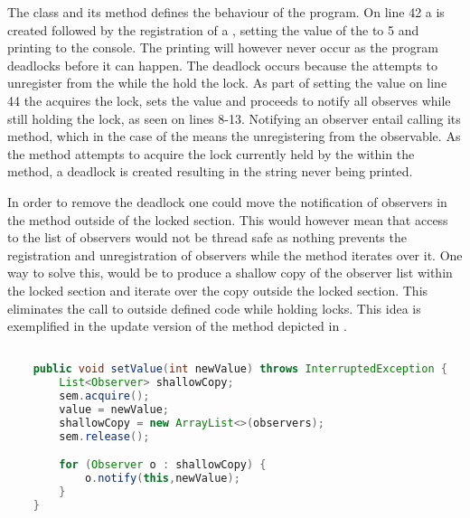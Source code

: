 The  class and its  method defines the behaviour of the program. On line 42 a  is created followed by the registration of a , setting the value of the  to 5 and printing  to the console. The printing will however never occur as the program deadlocks before it can happen. The deadlock occurs because the  attempts to unregister from the  while the  hold the lock. As part of setting the value on line 44 the  acquires the lock, sets the value and proceeds to notify all observes while still holding the lock, as seen on lines 8-13. Notifying an observer entail calling its  method, which in the case of the  means the  unregistering from the observable. As the  method attempts to acquire the lock currently held by the  within the  method, a deadlock is created resulting in the  string never being printed.

In order to remove the deadlock one could move the notification of observers in the  method outside of the locked section. This would however mean that access to the list of observers would not be thread safe as nothing prevents the registration and unregistration of observers while the  method iterates over it. One way to solve this, would be to produce a shallow copy of the observer list within the locked section and iterate over the copy outside the locked section. This eliminates the call to outside defined code while holding locks. This idea is exemplified in the update version of the  method depicted in .

\begin{lstlisting}[float,label=lst:observer_updated,
  caption={Observer pattern with locks},
  language=Java,  
  showspaces=false,
  showtabs=false,
  breaklines=true,
  showstringspaces=false,
  breakatwhitespace=true,
  commentstyle=\color{greencomments},
  keywordstyle=\color{bluekeywords},
  stringstyle=\color{redstrings}]  % Start your code-block

    public void setValue(int newValue) throws InterruptedException {
        List<Observer> shallowCopy;
        sem.acquire();
        value = newValue;
        shallowCopy = new ArrayList<>(observers);
        sem.release();

        for (Observer o : shallowCopy) {
            o.notify(this,newValue);
        }
    }
\end{lstlisting}

